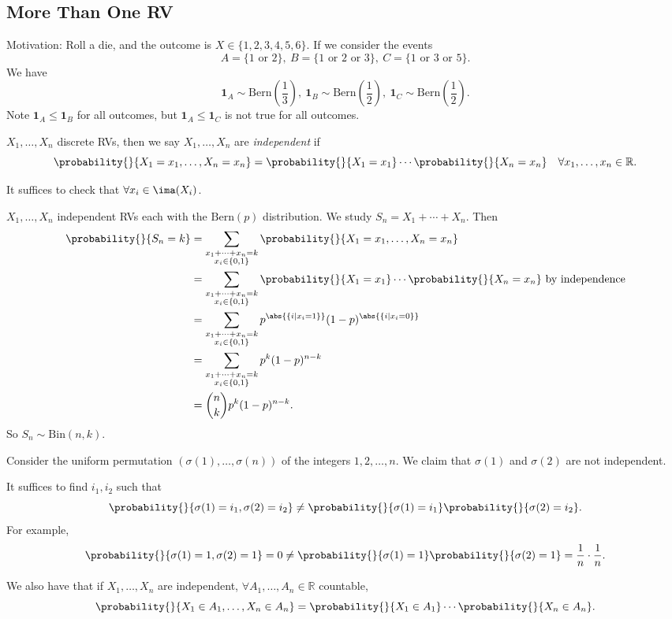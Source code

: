 \subsection{More Than One RV}
Motivation: Roll a die, and the outcome is \(X \in \{1,2,3,4,5,6\}\). If we consider the events
\[
    A = \{1 \text{ or } 2\},~B = \{1 \text{ or } 2 \text{ or } 3\},~C = \{1 \text{ or } 3 \text{ or } 5\}.
\]
We have
\[
    \textbf{1}_A \sim \mathrm{Bern}(\frac{1}{3}),~\textbf{1}_B \sim \mathrm{Bern}(\frac{1}{2}),~\textbf{1}_C \sim \mathrm{Bern}(\frac{1}{2}) .
\]
Note \(\textbf{1}_A \leq \textbf{1}_B\) for all outcomes, but \(\textbf{1}_A \leq \textbf{1}_C\) is not true for all outcomes.
\begin{definition}{}{}
    \(X_1, \ldots, X_n\) discrete RVs, then we say \(X_1, \ldots, X_n\) are \textit{independent} if
    \[
        \probability{}{X_1 = x_1, \ldots, X_n = x_n} = \probability{}{X_1 = x_1} \cdots \probability{}{X_n = x_n}\quad \forall x_1, \ldots, x_n \in \mathbb{R}.
    \]
\end{definition}
\begin{remark}
    It suffices to check that \(\forall x_i \in \ima(X_i)\).
\end{remark}
\begin{example}
    \(X_1, \ldots, X_n\) independent RVs each with the \(\mathrm{Bern}(p)\) distribution. We study \(S_n = X_1 + \cdots + X_n\). Then
    \begin{align*}
        \probability{}{S_n = k} &= \sum_{\substack{x_1 + \cdots + x_n = k\\x_i \in \{0,1\}}} \probability{}{X_1 = x_1, \ldots, X_n = x_n}\\
        &= \sum_{\substack{x_1 + \cdots + x_n = k\\x_i \in \{0,1\}}} \probability{}{X_1 = x_1}\cdots\probability{}{X_n = x_n} \text{ by independence}\\
        &= \sum_{\substack{x_1 + \cdots + x_n = k\\x_i \in \{0,1\}}}p^{\abs{\{i\mid x_i = 1\}}}(1-p)^{\abs{\{i\mid x_i = 0\}}}\\
        &= \sum_{\substack{x_1 + \cdots + x_n = k\\x_i \in \{0,1\}}}p^k(1-p)^{n-k}\\
        &= \binom{n}{k}p^k (1-p)^{n-k}.
    \end{align*}
    So \(S_n \sim \mathrm{Bin}(n, k)\).
\end{example}
\begin{example}
    Consider the uniform permutation \((\sigma(1), \ldots, \sigma(n))\) of the integers \(1, 2, \ldots, n\). We claim that \(\sigma(1)\) and \(\sigma(2)\) are not independent.

    It suffices to find \(i_1, i_2\) such that
    \[
        \probability{}{\sigma(1) = i_1, \sigma(2) = i_2} \neq \probability{}{\sigma(1)=i_1}\probability{}{\sigma(2) = i_2}.
    \]
    For example,
    \[
        \probability{}{\sigma(1) = 1, \sigma(2) = 1} = 0 \neq \probability{}{\sigma(1)=1}\probability{}{\sigma(2) = 1} = \frac{1}{n}\cdot \frac{1}{n}.
    \]
\end{example}
We also have that if \(X_1, \ldots, X_n\) are independent, \(\forall A_1, \ldots, A_n \in \mathbb{R}\) countable,
\[
    \probability{}{X_1 \in A_1, \ldots, X_n \in A_n} = \probability{}{X_1 \in A_1} \cdots \probability{}{X_n \in A_n}.
\]